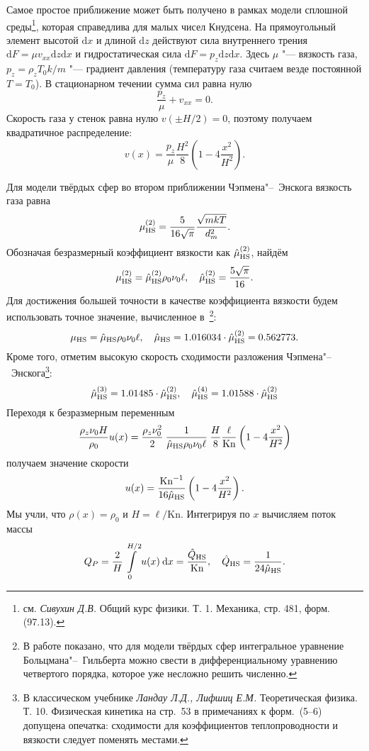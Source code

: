 \documentclass[a4paper,12pt]{article}
\newcommand{\dd}{\:\mathrm{d}}
\newcommand{\D}{\mathrm{d}}
\newcommand{\Kn}{\mathrm{Kn}}
\newcommand{\muHS}{\hat{\mu}_{\rm{HS}}}
\newcommand{\QHS}{\hat{Q}_{\rm{HS}}}
\begin{document}
Самое простое приближение может быть получено в рамках модели сплошной среды\footnote
{
	см. \textit{Сивухин Д.В.} Общий курс физики. Т. 1. Механика, стр. 481, форм. (97.13).
},
которая справедлива для малых чисел Кнудсена.
На прямоугольный элемент высотой \(\D x\) и длиной \(\D z\) действуют сила внутреннего трения
\(\D F = \mu v_{xx} \D z \D x \) и гидростатическая сила \(\D F = p_z \D z \D x \).
Здесь \(\mu\) "--- вязкость газа, \(p_z = \rho_z T_0 k/m\) "--- градиент давления (температуру газа считаем везде постоянной \(T=T_0\)).
В стационарном течении сумма сил равна нулю
\begin{equation}\label{eq:forces}
	\frac{p_z}{\mu} + v_{xx} = 0. 
\end{equation}
Скорость газа у стенок равна нулю \(v(\pm H/2) = 0\), поэтому получаем квадратичное распределение:
\[ v(x) = \frac{p_z}{\mu}\frac{H^2}{8}\left(1-4\frac{x^2}{H^2}\right). \]

Для модели твёрдых сфер во втором приближении Чэпмена"--~Энскога вязкость газа равна~\cite{Chapman1991}
\[ \mu_{\rm{HS}}^{(2)} = \frac{5}{16\sqrt\pi}\frac{\sqrt{mkT}}{d_m^2}. \]
Обозначая безразмерный коэффициент вязкости как \(\muHS^{(2)}\), найдём
\[ \mu_{\rm{HS}}^{(2)} = \muHS^{(2)}\rho_0\nu_0\ell, \quad \muHS^{(2)} = \frac{5\sqrt{\pi}}{16}. \]
Для достижения большей точности в качестве коэффициента вязкости будем использовать точное значение,
вычисленное в~\cite{Pekeris1957}\footnote{
	В работе показано, что для модели твёрдых сфер интегральное уравнение Больцмана"--~Гильберта
	можно свести в дифференциальному уравнению четвертого порядка, которое уже несложно решить численно.
}:
\begin{equation}\label{eq:eta_hs}
	\mu_{\rm{HS}} = \muHS\rho_0\nu_0\ell, \quad \muHS = 1.016034\cdot\muHS^{(2)} = 0.562773.
\end{equation}
Кроме того, отметим высокую скорость сходимости разложения Чэпмена"--~Энскога\footnote
{
	В классическом учебнике \textit{Ландау Л.Д., Лифшиц Е.М.} Теоретическая физика. Т. 10. Физическая кинетика
	на стр.~53 в примечаниях к форм.~(5--6) допущена опечатка:
	сходимости для коэффициентов теплопроводности и вязкости следует поменять местами.
}:
\[ \muHS^{(3)} = 1.01485\cdot\muHS^{(2)}, \quad \muHS^{(4)} = 1.01588\cdot\muHS^{(2)} \]
Переходя к безразмерным переменным
\[
	\frac{\rho_z \nu_0 H}{\rho_0}u(x) = \frac{\rho_z\nu_0^2}{2}\:
	\frac1{\muHS\rho_0\nu_0\ell}\:\frac{H}{8}\frac{\ell}{\Kn}
	\left(1-4\frac{x^2}{H^2}\right)
\]
получаем значение скорости
\[ u(x) = \frac{\Kn^{-1}}{16\muHS} \left(1-4\frac{x^2}{H^2}\right). \]
Мы учли, что \(\rho(x)=\rho_0\) и \(H=\ell/\Kn\).
Интегрируя по \(x\) вычисляем поток массы
\[ Q_P = \frac2{H}\int\limits_{0}^{H/2} u(x) \dd x = \frac{\QHS}{\Kn}, \quad \QHS = \frac1{24\muHS}. \]
\end{document}
